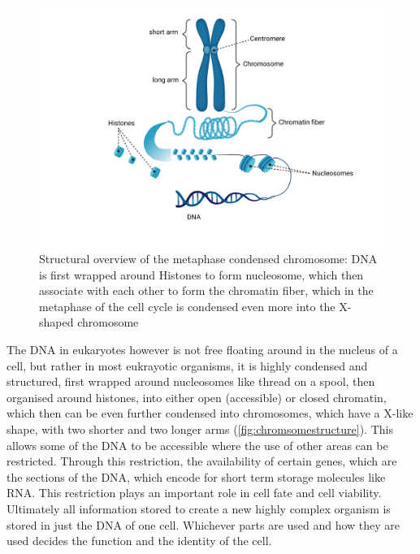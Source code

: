 \begin{figure}[!ht]
\centering
\includegraphics[width=0.9\linewidth]{Figures/ChromosomeStructure}
\caption[Overview Chromosome structure]{Structural overview of the metaphase condensed chromosome: DNA is first wrapped around Histones to form nucleosome, which then associate with each other to form the chromatin fiber, which in the metaphase of the cell cycle is condensed even more into the X-shaped chromosome}\label{fig:chromsomestructure}
\end{figure}

The DNA in eukaryotes however is not free floating around in the nucleus of a cell, but rather in most eukrayotic organisms, it is highly condensed and structured, first wrapped around nucleosomes like thread on a spool, then organised around histones, into either open (accessible) or closed chromatin, which then can be even further condensed into chromosomes, which have a X-like shape, with two shorter and two longer arms (\autoref{fig:chromsomestructure}). This allows some of the DNA to be accessible where the use of other areas can be restricted\cite{Hammond2017}. Through this restriction, the availability of certain genes, which are the sections of the DNA, which encode for short term storage molecules like RNA. This restriction plays an important role in cell fate and cell viability. Ultimately all information stored to create a new highly complex organism is stored in just the DNA of one cell. Whichever parts are used and how they are used decides the function and the identity of the cell\cite{Bonev2016}. 



